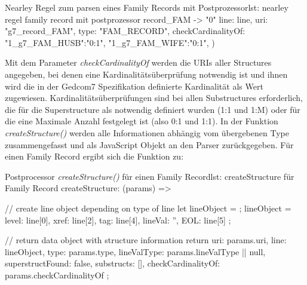\vspace{1em}
\begin{javascript}{Nearley Regel zum parsen eines Family Records mit Postprozessor}{lst: nearley regel family record mit postprozessor}
	record_FAM
		-> "0"  %
		 	{%
				line: line,
				uri: "g7_record_FAM", 
				type: "FAM_RECORD", 
				checkCardinalityOf: {
					"1_g7_FAM_HUSB":"0:1", 
					"1_g7_FAM_WIFE":"0:1",
				}
			}) %
\end{javascript}
\vspace{1em}
Mit dem Parameter \textit{checkCardinalityOf} werden die URIs aller Structures angegeben, bei denen eine Kardinalitätsüberprüfung notwendig ist und ihnen wird die in der Gedcom7 Spezifikation definierte Kardinalität als Wert zugewiesen. Kardinalitätsüberprüfungen sind bei allen Substructures erforderlich, die für die Superstructure als notwendig definiert wurden (1:1 und 1:M) oder für die eine Maximale Anzahl festgelegt ist (also 0:1 und 1:1). In der Funktion \textit{createStructure()} werden alle Informationen abhängig vom übergebenen Type zusammengefasst und als JavaScript Objekt an den Parser zurückgegeben. Für einen Family Record ergibt sich die Funktion zu:
\vspace{1em}
\begin{javascript}{Postprocessor \textit{createStructure()} für einen Family Record}{lst: createStructure für Family Record}
	createStructure: (params) => {
		// create line object depending on type of line
		let lineObject = {};
		lineObject = { 
			level: line[0], 
			xref: line[2], 
			tag: line[4], 
			lineVal: '', 
			EOL: line[5] 
		};
		
		// return data object with structure information
		return {
			uri: params.uri,
			line: lineObject,
			type: params.type,
			lineValType: params.lineValType || null,
			superstructFound: false,
			substructs: [],
			checkCardinalityOf: params.checkCardinalityOf
		};
	}
\end{javascript}
\vspace{1em}

